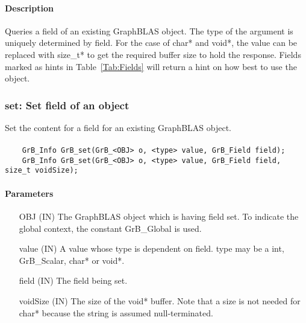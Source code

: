 \paragraph{Description}

Queries a field of an existing GraphBLAS object.
The type of the argument is uniquely determined by {\sf field}.
For the case of {\sf char*} and {\sf void*}, the value can be replaced with {\sf size\_t*}
to get the required buffer size to hold the response.
Fields marked as hints in Table~\ref{Tab:Fields} will return a hint on how best to use the
object.

\subsubsection{{\sf set}: Set field of an object}

Set the content for a field for an existing GraphBLAS object.

\paragraph{\syntax}

\begin{verbatim}
    GrB_Info GrB_set(GrB_<OBJ> o, <type> value, GrB_Field field);
    GrB_Info GrB_set(GrB_<OBJ> o, <type> value, GrB_Field field, size_t voidSize);
\end{verbatim}

\paragraph{Parameters}

\begin{itemize}[leftmargin=2.1in]
    \item[{\sf OBJ}] ({\sf IN}) The GraphBLAS object which is having {\sf field} set.
                                To indicate the global context, the constant {\sf GrB\_Global} is used.
    \item[{\sf value}] ({\sf IN}) A value whose type is dependent on {\sf field}.
                                {\sf type} may be a {\sf int}, {\sf GrB\_Scalar}, {\sf char*} or {\sf void*}.
    \item[{\sf field}] ({\sf IN}) The field being set.
    \item[{\sf voidSize}] ({\sf IN}) The size of the {\sf void*} buffer. Note that a size is not needed for
                                {\sf char*} because the string is assumed null-terminated.
\end{itemize}

